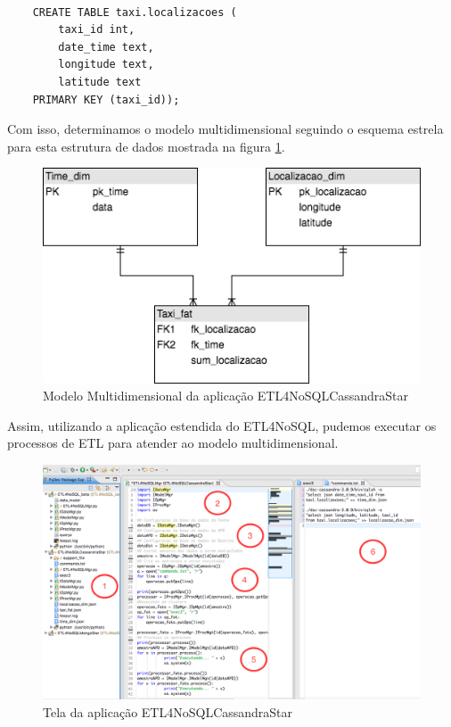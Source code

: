 \begin{lstlisting}[frame=single, language=Oberon-2, basicstyle=\tiny]

	CREATE TABLE taxi.localizacoes (  
		taxi_id int, 
		date_time text,
		longitude text,
		latitude text 
	PRIMARY KEY (taxi_id));

\end{lstlisting}

Com isso, determinamos o modelo multidimensional seguindo o esquema estrela para esta estrutura de dados mostrada na figura \ref{cassandramultidim}.

\begin{figure}[h!]
	\centering
	\includegraphics[scale=0.5]{fig/cassandra_multidim.png}
	\caption{Modelo Multidimensional da aplicação ETL4NoSQLCassandraStar}
	\label{cassandramultidim}
\end{figure}

Assim, utilizando a aplicação estendida do ETL4NoSQL, pudemos executar os processos de ETL para atender ao modelo multidimensional.

\begin{figure}[h!]
	\centering
	\includegraphics[scale=0.4]{fig/ETL4NoSQLCassandraStar.png}
	\caption{Tela da aplicação ETL4NoSQLCassandraStar}
	\label{ETL4NoSQLCassandraStar}
\end{figure}

